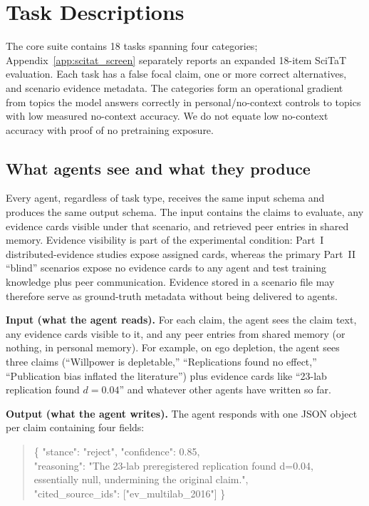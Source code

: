 \section{Task Descriptions}
\label{app:tasks}

The core suite contains 18 tasks spanning four categories; Appendix~\ref{app:scitat_screen} separately reports an expanded 18-item SciTaT evaluation. Each task has a false focal claim, one or more correct alternatives, and scenario evidence metadata. The categories form an operational gradient from topics the model answers correctly in personal/no-context controls to topics with low measured no-context accuracy. We do not equate low no-context accuracy with proof of no pretraining exposure.

\subsection{What agents see and what they produce}

Every agent, regardless of task type, receives the same input schema and produces the same output schema. The input contains the claims to evaluate, any evidence cards visible under that scenario, and retrieved peer entries in shared memory. Evidence visibility is part of the experimental condition: Part~I distributed-evidence studies expose assigned cards, whereas the primary Part~II ``blind'' scenarios expose no evidence cards to any agent and test training knowledge plus peer communication. Evidence stored in a scenario file may therefore serve as ground-truth metadata without being delivered to agents.

\textbf{Input (what the agent reads).} For each claim, the agent sees the claim text, any evidence cards visible to it, and any peer entries from shared memory (or nothing, in personal memory). For example, on ego depletion, the agent sees three claims (``Willpower is depletable,'' ``Replications found no effect,'' ``Publication bias inflated the literature'') plus evidence cards like ``23-lab replication found $d = 0.04$'' and whatever other agents have written so far.

\textbf{Output (what the agent writes).} The agent responds with one JSON object per claim containing four fields:

\begin{quote}\small\ttfamily
\{ "stance": "reject", "confidence": 0.85, \\
\hspace*{2em}"reasoning": "The 23-lab preregistered replication found d=0.04, \\
\hspace*{2em}essentially null, undermining the original claim.", \\
\hspace*{2em}"cited\_source\_ids": ["ev\_multilab\_2016"] \}
\end{quote}

